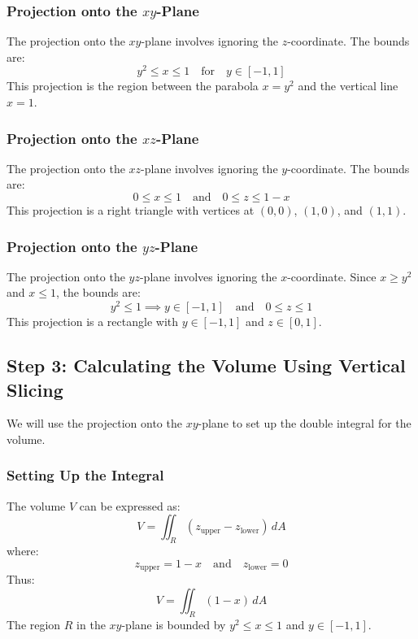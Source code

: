 \documentclass[11pt]{article}
\begin{document}
\subsubsection{Projection onto the \( xy \)-Plane}

The projection onto the \( xy \)-plane involves ignoring the \( z \)-coordinate. The bounds are:
\[
y^2 \leq x \leq 1 \quad \text{for} \quad y \in [-1, 1]
\]
This projection is the region between the parabola \( x = y^2 \) and the vertical line \( x = 1 \).

\subsubsection{Projection onto the \( xz \)-Plane}

The projection onto the \( xz \)-plane involves ignoring the \( y \)-coordinate. The bounds are:
\[
0 \leq x \leq 1 \quad \text{and} \quad 0 \leq z \leq 1 - x
\]
This projection is a right triangle with vertices at \((0,0)\), \((1,0)\), and \((1,1)\).

\subsubsection{Projection onto the \( yz \)-Plane}

The projection onto the \( yz \)-plane involves ignoring the \( x \)-coordinate. Since \( x \geq y^2 \) and \( x \leq 1 \), the bounds are:
\[
y^2 \leq 1 \implies y \in [-1, 1] \quad \text{and} \quad 0 \leq z \leq 1
\]
This projection is a rectangle with \( y \in [-1, 1] \) and \( z \in [0, 1] \).

\subsection{Step 3: Calculating the Volume Using Vertical Slicing}

We will use the projection onto the \( xy \)-plane to set up the double integral for the volume.

\subsubsection{Setting Up the Integral}

The volume \( V \) can be expressed as:
\[
V = \iint_{R} \left( z_{\text{upper}} - z_{\text{lower}} \right) \, dA
\]
where:
\[
z_{\text{upper}} = 1 - x \quad \text{and} \quad z_{\text{lower}} = 0
\]
Thus:
\[
V = \iint_{R} (1 - x) \, dA
\]
The region \( R \) in the \( xy \)-plane is bounded by \( y^2 \leq x \leq 1 \) and \( y \in [-1, 1] \).
\end{document}
